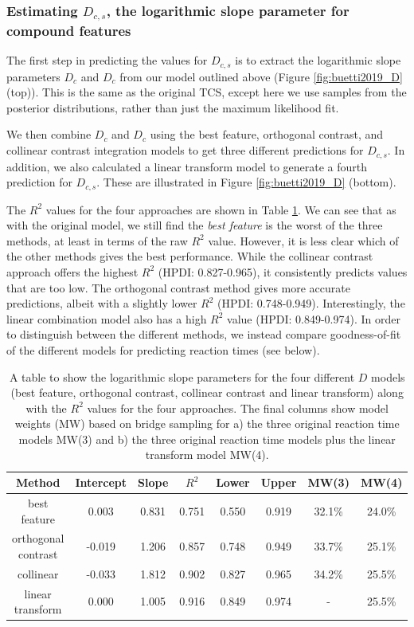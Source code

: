 \documentclass[preprint,12pt,authoryear]{elsarticle}
\begin{document}
\subsubsection{Estimating $D_{c,s}$, the logarithmic slope parameter for compound features}

The first step in predicting the values for $D_{c,s}$ is to extract the logarithmic slope parameters $D_c$ and $D_c$ from our model outlined above (Figure \ref{fig:buetti2019_D} (top)). This is the same as the original TCS, except here we use samples from the posterior distributions, rather than just the maximum likelihood fit. 

We then combine $D_c$ and $D_c$ using the best feature, orthogonal contrast, and collinear contrast integration models to get three different predictions for $D_{c,s}$. In addition, we also calculated a linear transform model to generate a fourth prediction for $D_{c,s}$. These are illustrated in Figure \ref{fig:buetti2019_D} (bottom).

The $R^2$ values for the four approaches are shown in Table \ref{tab:reimp_D_r2}. We can see that as with the original model, we still find the \textit{best feature} is the worst of the three methods, at least in terms of the raw $R^2$ value. However, it is less clear which of the other methods gives the best performance. While the collinear contrast approach offers the highest $R^2$ (HPDI: 0.827-0.965), it consistently predicts values that are too low. The orthogonal contrast method gives more accurate predictions, albeit with a slightly lower $R^2$ (HPDI: 0.748-0.949). Interestingly, the linear combination model also has a high $R^2$ value (HPDI: 0.849-0.974). In order to distinguish between the different methods, we instead compare goodness-of-fit of the different models for predicting reaction times (see below).

\begin{table}[ht]
\small
\centering
\begin{tabular}{ c|cc|ccc|cc } 
Method & Intercept & Slope & $R^2$ & Lower & Upper & MW(3) & MW(4) \\
 \hline 
best feature & 0.003 & 0.831 & 0.751 & 0.550 & 0.919 & 32.1\% & 24.0\%\\ 
orthogonal contrast & -0.019 & 1.206 & 0.857 & 0.748 & 0.949 & 33.7\% & 25.1\%\\ 
collinear & -0.033 & 1.812	& 0.902 & 0.827 & 0.965 & 34.2\% & 25.5\%\\
linear transform & 0.000 & 1.005 & 0.916 & 0.849 & 0.974 & - & 25.5\%\\
\end{tabular}
\caption{A table to show the logarithmic slope parameters for the four different $D$ models (best feature, orthogonal contrast, collinear contrast and linear transform) along with the $R^2$ values for the four approaches. The final columns show model weights (MW) based on bridge sampling for a) the three original reaction time models MW(3) and b) the three original reaction time models plus the linear transform model MW(4).}
\label{tab:reimp_D_r2}
\end{table}
\end{document}
